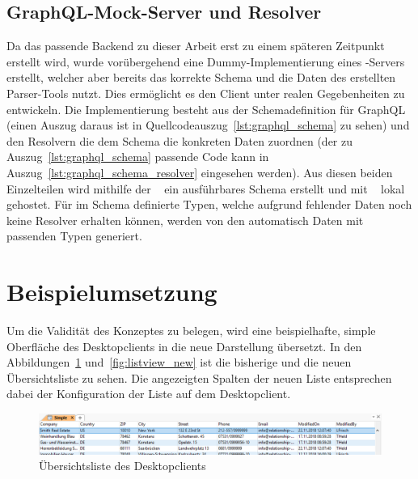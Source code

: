 \subsection{GraphQL-Mock-Server und Resolver}
Da das passende Backend zu dieser Arbeit erst zu einem späteren Zeitpunkt erstellt wird, wurde vorübergehend eine Dummy-Implementierung eines -Servers erstellt, welcher aber bereits das korrekte Schema und die Daten des erstellten Parser-Tools nutzt. Dies ermöglicht es den Client unter realen Gegebenheiten zu entwickeln. Die Implementierung besteht aus der Schemadefinition für GraphQL (einen Auszug daraus ist in Quellcodeauszug~\ref{lst:graphql_schema} zu sehen) und den Resolvern die dem Schema die konkreten Daten zuordnen (der zu Auszug~\ref{lst:graphql_schema} passende Code kann in Auszug~\ref{lst:graphql_schema_resolver} eingesehen werden). Aus diesen beiden Einzelteilen wird mithilfe der ~\parencite{apollo_graphql-tools_2019} ein ausführbares Schema erstellt und mit ~\parencite{express_graphql_2018} lokal gehostet. Für im Schema definierte Typen, welche aufgrund fehlender Daten noch keine Resolver erhalten können, werden von den  automatisch Daten mit passenden Typen generiert.





\section{Beispielumsetzung}
Um die Validität des Konzeptes zu belegen, wird eine beispielhafte, simple Oberfläche des  Desktopclients in die neue Darstellung übersetzt. In den Abbildungen~\ref{fig:listview_crm} und~\ref{fig:listview_new} ist die bisherige und die neuen Übersichtsliste zu sehen. Die angezeigten Spalten der neuen Liste entsprechen dabei der Konfiguration der Liste auf dem Desktopclient. 

\begin{figure}
    \centering
    \captionsetup{justification=centering}
    \includegraphics[width=\textwidth]{figures/listview_crm.png}
        \caption{Übersichtsliste des Desktopclients}\label{fig:listview_crm}
\end{figure}


